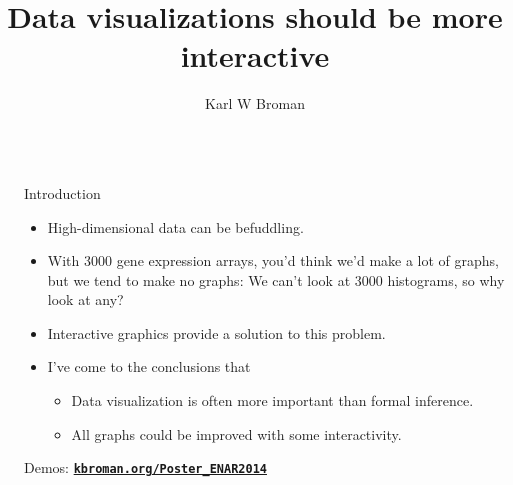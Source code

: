 \documentclass[final,plain]{beamer}
\title{Data visualizations should be more interactive}
\author{Karl W Broman}
\institute{Biostatistics \&
  Medical Informatics, University of Wisconsin--Madison}
\newlength{\sepwid}
\newlength{\onecolwid}
\newcommand{\bi}{\begin{itemize}}
\newcommand{\ei}{\end{itemize}}
\newcommand{\bluebold}{\color{dblue} \bf}
\newcommand{\colonevsep}{\vspace{16mm}}
\newcommand{\hilit}{\color{mypurple}}
\begin{document}
\begin{frame}[t]

\begin{columns}[t]
  \begin{column}{\sepwid}\end{column} %

  \begin{column}{\onecolwid}

    \begin{exampleblock}{\Large Introduction}{
        \bi \itemsep18pt
        \item High-dimensional data can be {\hilit befuddling}.
        \item With 3000 gene expression arrays, you'd think we'd make
          {\hilit a lot} of graphs, but we tend to make {\hilit no}
          graphs: We can't look at 3000 histograms, so why look at any?
        \item {\hilit Interactive graphics} provide a solution to this problem.
        \item I've come to the conclusions that
          \vspace{8pt}
           \bi \itemsep14pt
           \item Data visualization is often more important than
             formal inference.
           \item All graphs could be improved with some interactivity.
           \ei
        \ei

     \vspace{18pt}

        \centerline{Demos:
        \href{https://kbroman.org/Poster_ENAR2014}{\tt \textbf{kbroman.org/Poster\_ENAR2014}}}

     }
    \end{exampleblock}


  \colonevsep %

\end{column}
\end{columns}
\end{frame}
\end{document}
